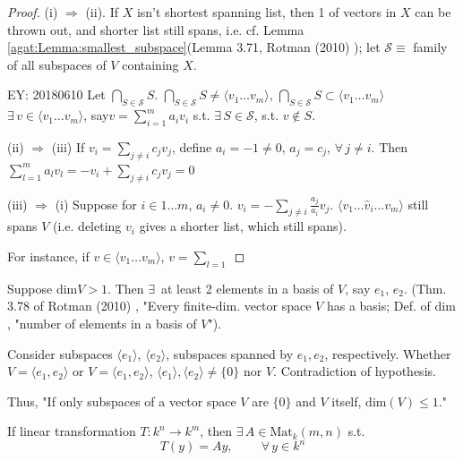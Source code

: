 \begin{proof}
(i) $\Longrightarrow$ (ii). If $X$ isn't shortest spanning list, then 1 of vectors in $X$ can be thrown out, and shorter list still spans, i.e. cf. Lemma \ref{agat:Lemma:smallest_subspace}(Lemma 3.71, Rotman (2010) \cite{agat:JRotman2010}); let $\mathcal{S} \equiv $ family of all subspaces of $V$ containing $X$. 

EY: 20180610 
Let $\bigcap_{S\in \mathcal{S}} S$. $\bigcap_{S \in \mathcal{S}} S \neq \langle v_1 \dots v_m \rangle$, $\bigcap_{S \in \mathcal{S}} S \subset \langle v_1 \dots v_m \rangle$ \\
$\exists \, v \in \langle v_1 \dots v_m \rangle$, say$v= \sum_{i=1}^m a_i v_i$ s.t. $\exists \, S \in \mathcal{S}$, s.t. $v\notin S$.  

(ii) $\Longrightarrow$ (iii) If $v_i = \sum_{j\neq i} c_j v_j$, define $a_i  = -1 \neq 0$, $a_j = c_j$, $\forall \, j \neq i$.  Then $\sum_{l=1}^m a_l v_l = -v_i + \sum_{j\neq i } c_j v_j = 0$

(iii) $\Longrightarrow$ (i) Suppose for $i \in 1 \dots m$, $a_i \neq 0$.  $v_i = -\sum_{j\neq i} \frac{a_j}{a_i} v_j$.  $\langle v_1 \dots \widehat{v}_i \dots v_m\rangle$ still spans $V$ (i.e. deleting $v_i$ gives a shorter list, which still spans).  

For instance, if $v\in \langle v_1 \dots v_m \rangle$, $v= \sum_{l=1}$





	\end{proof}

 Suppose $\text{dim}V >1$. Then $\exists \, $ at least 2 elements in a basis of $V$, say $e_1$, $e_2$. (Thm. 3.78 of Rotman (2010) \cite{agat:JRotman2010}, "Every finite-dim. vector space $V$ has a basis; Def. of $\text{dim}$, "number of elements in a basis of $V$").   

Consider subspaces $\langle e_1 \rangle$, $\langle e_2 \rangle$, subspaces spanned by $e_1,e_2$, respectively. Whether $V= \langle e_1, e_2 \rangle$ or $V= \langle e_1, e_2\rangle$, $\langle e_1 \rangle , \langle e_2 \rangle \neq \lbrace 0 \rbrace$ nor $V$. Contradiction of hypothesis.  

Thus, "If only subspaces of a vector space $V$ are $\lbrace 0 \rbrace$ and $V$ itself, $\text{dim}(V) \leq 1$."



\begin{proposition}\label{agat:Prop:MatRepofLinearTransform}
	If linear transformation $T: k^n \to k^m$, then $\exists \,  A \in \text{Mat}_k(m,n)$ s.t. 
	\[
	T(y) = Ay, \qquad \  \forall \, y \in k^n
	\]
\end{proposition}

